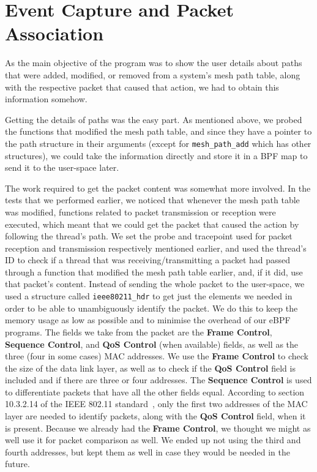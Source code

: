 \section{Event Capture and Packet Association}\label{sect:evepktasc}

As the main objective of the program was to show the user details about paths
that were added, modified, or removed from a system's mesh path table, along
with the respective packet that caused that action, we had to obtain this
information somehow.

Getting the details of paths was the easy part. As mentioned above, we probed
the functions that modified the mesh path table, and since they have a pointer
to the path structure in their arguments (except for \texttt{mesh\_path\_add}
which has other structures), we could take the information directly and store it
in a BPF map to send it to the user-space later.

The work required to get the packet content was somewhat more involved. In the
tests that we performed earlier, we noticed that whenever the mesh path table
was modified, functions related to packet transmission or reception were
executed, which meant that we could get the packet that caused the action by
following the thread's path. We set the probe and tracepoint used for packet
reception and transmission respectively mentioned earlier, and used the thread's
ID to check if a thread that was receiving/transmitting a packet had passed
through a function that modified the mesh path table earlier, and, if it did,
use that packet's content. Instead of sending the whole packet to the
user-space, we used a structure called \texttt{ieee80211\_hdr} to get just the
elements we needed in order to be able to unambiguously identify the packet.
We do this to keep the memory usage as low as possible and to minimise the
overhead of our eBPF programs. The fields we take from the packet are the
\textbf{Frame Control}, \textbf{Sequence Control}, and \textbf{QoS Control}
(when available) fields, as well as the three (four in some cases) MAC
addresses. We use the \textbf{Frame Control} to check the size of the data link
layer, as well as to check if the \textbf{QoS Control} field is included and if
there are three or four addresses. The \textbf{Sequence Control} is used to
differentiate packets that have all the other fields equal. According to section
10.3.2.14 of the \ac{IEEE} 802.11 standard~\cite{ieee80211}, only the first two
addresses of the MAC layer are needed to identify packets, along with the
\textbf{QoS Control} field, when it is present. Because we already had the
\textbf{Frame Control}, we thought we might as well use it for packet comparison
as well. We ended up not using the third and fourth addresses, but kept them as
well in case they would be needed in the future.
